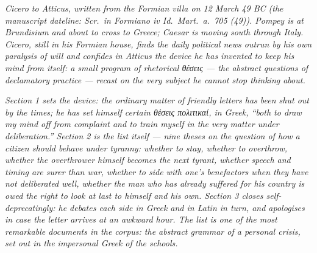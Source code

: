 
\textit{Cicero to Atticus, written from the Formian villa on
12 March 49 BC (the manuscript dateline: \textit{Scr.\ in
Formiano iv Id.\ Mart.\ a.\ 705 (49)}). Pompey is at
Brundisium and about to cross to Greece; Caesar is moving
south through Italy. Cicero, still in his Formian house,
finds the daily political news outrun by his own paralysis
of will and confides in Atticus the device he has invented
to keep his mind from itself: a small program of rhetorical
\textgreek{θέσεις} --- the abstract questions of
declamatory practice --- recast on the very subject he
cannot stop thinking about.}

\textit{Section 1 sets the device: the ordinary matter of
friendly letters has been shut out by the times; he has
set himself certain \textgreek{θέσεις πολιτικαί}, in
Greek, ``both to draw my mind off from complaint and to
train myself in the very matter under deliberation.''
Section 2 is the list itself --- nine theses on the
question of how a citizen should behave under tyranny:
whether to stay, whether to overthrow, whether the
overthrower himself becomes the next tyrant, whether
speech and timing are surer than war, whether to side
with one's benefactors when they have not deliberated
well, whether the man who has already suffered for his
country is owed the right to look at last to himself and
his own. Section 3 closes self-deprecatingly: he debates
each side in Greek and in Latin in turn, and apologises
in case the letter arrives at an awkward hour. The list
is one of the most remarkable documents in the corpus:
the abstract grammar of a personal crisis, set out in
the impersonal Greek of the schools.}
